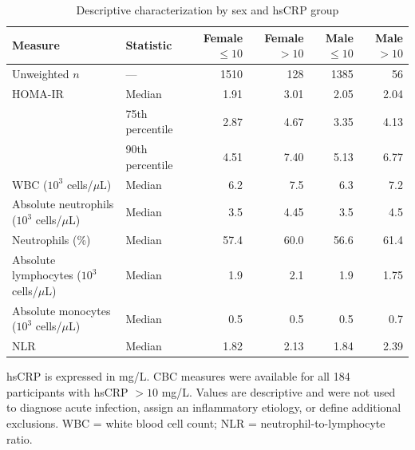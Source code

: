 \documentclass[11pt]{article}
\begin{document}
\begin{table}[htbp]
\centering
\caption{Descriptive characterization by sex and hsCRP group}
\label{tab:s4_hscrp_descriptive}
\begin{threeparttable}
\small
\begin{tabular}{llrrrr}
\toprule
Measure & Statistic & Female $\leq10$ & Female $>10$ & Male $\leq10$ & Male $>10$ \\
\midrule
Unweighted $n$ & --- & 1510 & 128 & 1385 & 56 \\
HOMA-IR & Median & 1.91 & 3.01 & 2.05 & 2.04 \\
 & 75th percentile & 2.87 & 4.67 & 3.35 & 4.13 \\
 & 90th percentile & 4.51 & 7.40 & 5.13 & 6.77 \\
WBC ($10^3$ cells/$\mu$L) & Median & 6.2 & 7.5 & 6.3 & 7.2 \\
Absolute neutrophils ($10^3$ cells/$\mu$L) & Median & 3.5 & 4.45 & 3.5 & 4.5 \\
Neutrophils (\%) & Median & 57.4 & 60.0 & 56.6 & 61.4 \\
Absolute lymphocytes ($10^3$ cells/$\mu$L) & Median & 1.9 & 2.1 & 1.9 & 1.75 \\
Absolute monocytes ($10^3$ cells/$\mu$L) & Median & 0.5 & 0.5 & 0.5 & 0.7 \\
NLR & Median & 1.82 & 2.13 & 1.84 & 2.39 \\
\bottomrule
\end{tabular}
\begin{tablenotes}[flushleft]
\footnotesize
\item hsCRP is expressed in mg/L. CBC measures were available for all 184
participants with hsCRP $>10$ mg/L. Values are descriptive and were not used
to diagnose acute infection, assign an inflammatory etiology, or define
additional exclusions. WBC = white blood cell count; NLR =
neutrophil-to-lymphocyte ratio.
\end{tablenotes}
\end{threeparttable}
\end{table}
\end{document}
